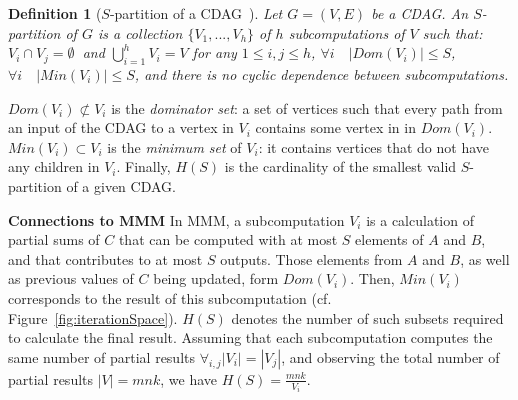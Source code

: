 \documentclass[sigplan,review,anonymous]{acmart}\settopmatter{printfolios=true,printccs=false,printacmref=false}
\newcommand\mac[1]{\textcolor{red}{[Mac: #1]}}
\newtheorem{defn}{Definition}
\newcommand{\macb}[1]{\textbf{\textsf{#1}}}
\begin{document}
\begin{defn}[$S$-partition of a CDAG~\cite{redblue}] \label{df:s-partition}
	Let $G = (V,E)$ be a CDAG. An $S$-partition of $G$ is a collection $\{V_1, 
	...,
	V_h\}$ of $h$ subcomputations of $ V$ such that:  $V_i \cap V_j
	=\emptyset\ $ and $\bigcup_{i=1}^{h} V_i=V$ for any $1 \le i,j \le h$,
	 $\forall i\quad |Dom(V_i)| \le S$,  $\forall i\quad
	|Min(V_i)| \le S$, and  there is no cyclic dependence between
	subcomputations.
\end{defn}

$Dom(V_i) \not \subset V_i$ is the \emph{dominator set}: a set of vertices such 
that
every path from an input of the CDAG to a vertex in $V_i$ contains some 
vertex in in
$Dom(V_i)$.
%
$Min(V_i) \subset V_i$ is the \emph{minimum set} of $V_i$: it contains vertices
that do not have any children in $V_i$. 
%
%
Finally, $H(S)$ is the cardinality of the smallest valid $S$-partition of a
given CDAG.
%

\macb{Connections to MMM}
%
In MMM, a subcomputation $V_i$ is a calculation of partial sums of $C$ that can
be computed with at most $S$ elements of $A$ and $B$, and that contributes to
at most $S$ outputs. Those elements from $A$ and $B$, as well as previous
values of $C$ being updated, form $Dom(V_i)$. Then, $Min(V_i)$ corresponds to
the result of this subcomputation (cf.~
Figure~\ref{fig:iterationSpace}). $H(S)$ denotes 
the
number of such subsets required to calculate the final result. Assuming that 
each subcomputation computes the same number of partial results 
$\forall_{i,j}|V_i| = |V_j|$, and observing the total number of partial results 
$|V| = mnk$, we have $H(S) = \frac{mnk}{V_i}$.
\end{document}
